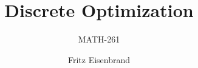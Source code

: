 \documentclass[aspectratio=169,xcolor=dvipsnames,noframenumbering]{beamer}
\title{Discrete Optimization}
\subtitle{MATH-261}
\author[Eisenbrand]{Fritz Eisenbrand}
\date{}
\begin{document}
\begin{frame}[plain]
    \titlepage
\end{frame}

\pagestyle{empty} 




 
\end{document}
